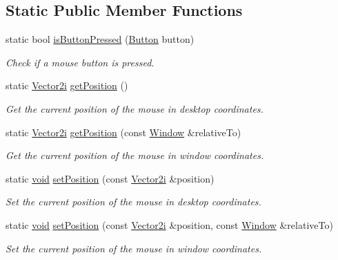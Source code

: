\subsection*{Static Public Member Functions}
\begin{DoxyCompactItemize}
\item 
static bool \hyperlink{classsf_1_1_mouse_ab647159eb88e369a0332a9c5a7ba6687}{is\-Button\-Pressed} (\hyperlink{classsf_1_1_mouse_a4fb128be433f9aafe66bc0c605daaa90}{Button} button)
\begin{DoxyCompactList}\small\item\em Check if a mouse button is pressed. \end{DoxyCompactList}\item 
static \hyperlink{namespacesf_ace09dd1447d74c6e9ba56ae874c094e1}{Vector2i} \hyperlink{classsf_1_1_mouse_ac368680f797b7f6e4f50b5b7928c1387}{get\-Position} ()
\begin{DoxyCompactList}\small\item\em Get the current position of the mouse in desktop coordinates. \end{DoxyCompactList}\item 
static \hyperlink{namespacesf_ace09dd1447d74c6e9ba56ae874c094e1}{Vector2i} \hyperlink{classsf_1_1_mouse_a93b4d2ebef728e77a0ec9d83c1e0b0c8}{get\-Position} (const \hyperlink{classsf_1_1_window}{Window} \&relative\-To)
\begin{DoxyCompactList}\small\item\em Get the current position of the mouse in window coordinates. \end{DoxyCompactList}\item 
static \hyperlink{glutf90_8h_ac778d6f63f1aaf8ebda0ce6ac821b56e}{void} \hyperlink{classsf_1_1_mouse_a1222e16c583be9e3d176d86e0b7817d7}{set\-Position} (const \hyperlink{namespacesf_ace09dd1447d74c6e9ba56ae874c094e1}{Vector2i} \&position)
\begin{DoxyCompactList}\small\item\em Set the current position of the mouse in desktop coordinates. \end{DoxyCompactList}\item 
static \hyperlink{glutf90_8h_ac778d6f63f1aaf8ebda0ce6ac821b56e}{void} \hyperlink{classsf_1_1_mouse_ad9b16ec7041531315f06b26b413dfea8}{set\-Position} (const \hyperlink{namespacesf_ace09dd1447d74c6e9ba56ae874c094e1}{Vector2i} \&position, const \hyperlink{classsf_1_1_window}{Window} \&relative\-To)
\begin{DoxyCompactList}\small\item\em Set the current position of the mouse in window coordinates. \end{DoxyCompactList}\end{DoxyCompactItemize}


